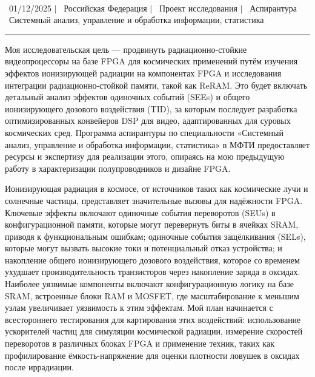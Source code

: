 \documentclass[a4paper,11pt]{article}
\begin{document}
\begin{center}
    {\Huge {\fontsize{25}{30}\selectfont{Реза}} {\fontsize{25}{30}}} \\ 
    \vspace{3pt}
    {\small \raisebox{-0.2\height}\ {01/12/2025}} $|$
    {\small \raisebox{-0.2\height}\ {Российская Федерация}} $|$
    {\small \raisebox{-0.2\height}\ {Проект исследования}} $|$
    {\small \raisebox{-0.2\height}\ {Аспирантура}}
    \\
    {\small \raisebox{-0.2\height}\ {Системный анализ, управление и обработка информации, статистика}} 
    \vspace{-10pt}
\end{center}
\vspace{-10pt}

\noindent\rule{\textwidth}{1pt}

Моя исследовательская цель — продвинуть радиационно-стойкие видеопроцессоры на базе FPGA для космических применений путём изучения эффектов ионизирующей радиации на компонентах FPGA и исследования интеграции радиационно-стойкой памяти, такой как ReRAM. Это будет включать детальный анализ эффектов одиночных событий (SEEs) и общего ионизирующего дозового воздействия (TID), за которым последует разработка оптимизированных конвейеров DSP для видео, адаптированных для суровых космических сред. Программа аспирантуры по специальности «Системный анализ, управление и обработка информации, статистика» в МФТИ предоставляет ресурсы и экспертизу для реализации этого, опираясь на мою предыдущую работу в характеризации полупроводников и дизайне FPGA.

\vspace{10pt}

Ионизирующая радиация в космосе, от источников таких как космические лучи и солнечные частицы, представляет значительные вызовы для надёжности FPGA. Ключевые эффекты включают одиночные события переворотов (SEUs) в конфигурационной памяти, которые могут перевернуть биты в ячейках SRAM, приводя к функциональным ошибкам; одиночные события защёлкивания (SELs), которые могут вызвать высокие токи и потенциальный отказ устройства; и накопление общего ионизирующего дозового воздействия, которое со временем ухудшает производительность транзисторов через накопление заряда в оксидах. Наиболее уязвимые компоненты включают конфигурационную логику на базе SRAM, встроенные блоки RAM и MOSFET, где масштабирование к меньшим узлам увеличивает уязвимость к этим эффектам. Мой план начинается с всестороннего тестирования для картирования этих воздействий: использование ускорителей частиц для симуляции космической радиации, измерение скоростей переворотов в различных блоках FPGA и применение техник, таких как профилирование ёмкость-напряжение для оценки плотности ловушек в оксидах после иррадиации.
\end{document}
